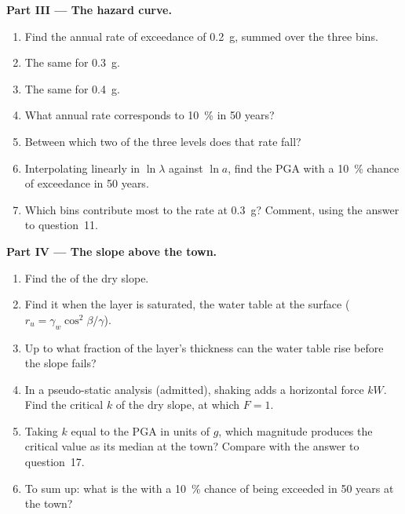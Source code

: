 \begin{problem}
\noindent\textbf{Part III --- The hazard curve.}
\begin{enumerate}[resume]
  \item Find the annual rate of exceedance of \qty{0.2}{g}, summed over the three bins.
  \item The same for \qty{0.3}{g}.
  \item The same for \qty{0.4}{g}.
  \item What annual rate corresponds to \qty{10}{\percent} in 50 years?
  \item Between which two of the three levels does that rate fall?
  \item Interpolating linearly in $\ln\lambda$ against $\ln a$, find the PGA with a
        \qty{10}{\percent} chance of exceedance in 50 years.
  \item Which bins contribute most to the rate at \qty{0.3}{g}? Comment, using the answer to
        question~11.
\end{enumerate}

\noindent\textbf{Part IV --- The slope above the town.}
\begin{enumerate}[resume]
  \item Find the  of the dry slope.
  \item Find it when the layer is saturated, the water table at the surface ($r_u =
        \gamma_w\cos^2\beta/\gamma$).
  \item Up to what fraction of the layer's thickness can the water table rise before the slope fails?
  \item In a pseudo-static analysis (admitted), shaking adds a horizontal force $kW$. Find the
        critical $k$ of the dry slope, at which $F = 1$.
  \item Taking $k$ equal to the PGA in units of $g$, which magnitude produces the critical value as
        its median at the town? Compare with the answer to question~17.
  \item To sum up: what is the  with a \qty{10}{\percent} chance of being
        exceeded in 50 years at the town?
\end{enumerate}
\end{problem}
